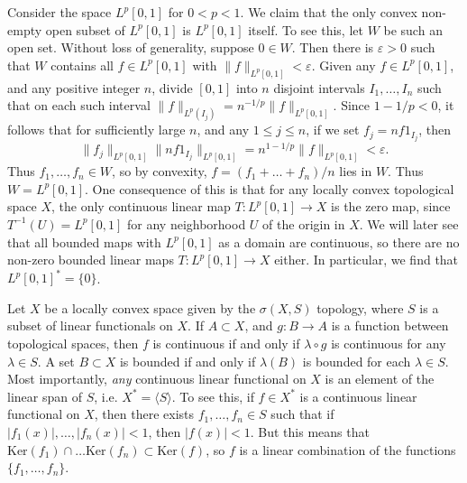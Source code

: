 \begin{example}
    Consider the space $L^p[0,1]$ for $0 < p < 1$. We claim that the only convex non-empty open subset of $L^p[0,1]$ is $L^p[0,1]$ itself. To see this, let $W$ be such an open set. Without loss of generality, suppose $0 \in W$. Then there is $\varepsilon > 0$ such that $W$ contains all $f \in L^p[0,1]$ with $\| f \|_{L^p[0,1]} < \varepsilon$. Given any $f \in L^p[0,1]$, and any positive integer $n$, divide $[0,1]$ into $n$ disjoint intervals $I_1, \dots, I_n$ such that on each such interval $\| f \|_{L^p(I_j)} = n^{-1/p} \| f \|_{L^p[0,1]}$. Since $1 - 1/p < 0$, it follows that for sufficiently large $n$, and any $1 \leq j \leq n$, if we set $f_j = n f 1_{I_j}$, then
    \[ \| f_j \|_{L^p[0,1]} \| n f 1_{I_j} \|_{L^p[0,1]} = n^{1 - 1/p} \| f \|_{L^p[0,1]} < \varepsilon. \]
    Thus $f_1,\dots,f_n \in W$, so by convexity, $f = (f_1 + \dots + f_n) / n$ lies in $W$. Thus $W = L^p[0,1]$. One consequence of this is that for any locally convex topological space $X$, the only continuous linear map $T: L^p[0,1] \to X$ is the zero map, since $T^{-1}(U) = L^p[0,1]$ for any neighborhood $U$ of the origin in $X$. We will later see that all bounded maps with $L^p[0,1]$ as a domain are continuous, so there are no non-zero bounded linear maps $T: L^p[0,1] \to X$ either. In particular, we find that $L^p[0,1]^* = \{ 0 \}$.
\end{example}

\begin{example}
    Let $X$ be a locally convex space given by the $\sigma(X,S)$ topology, where $S$ is a subset of linear functionals on $X$. If $A \subset X$, and $g: B \to A$ is a function between topological spaces, then $f$ is continuous if and only if $\lambda \circ g$ is continuous for any $\lambda \in S$. A set $B \subset X$ is bounded if and only if $\lambda(B)$ is bounded for each $\lambda \in S$. Most importantly, \emph{any} continuous linear functional on $X$ is an element of the linear span of $S$, i.e. $X^* = \langle S \rangle$. To see this, if $f \in X^*$ is a continuous linear functional on $X$, then there exists $f_1,\dots,f_n \in S$ such that if $|f_1(x)|, \dots, |f_n(x)| < 1$, then $|f(x)| < 1$. But this means that $\text{Ker}(f_1) \cap \dots \text{Ker}(f_n) \subset \text{Ker}(f)$, so $f$ is a linear combination of the functions $\{ f_1, \dots, f_n \}$.
\end{example}


